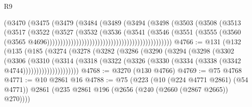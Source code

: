 \begin{lexlean}{R9}
\begin{coremodule}
                                                        (@3470
                                                          (@3475
                                                            (@3479
                                                              (@3484
                                                                (@3489
                                                                  (@3494
                                                                    (@3498
                                                                      (@3503
                                                                        (@3508
                                                                          (@3513
                                                                            (@3517
                                                                              (@3522
                                                                                (@3527
                                                                                  (@3532
                                                                                    (@3536
                                                                                      (@3541
                                                                                        (@3546
                                                                                          (@3551
                                                                                            (@3555
                                                                                              (@3560
                                                                                                (@3565
                                                                                                  @4696)))))))))))))))))))))))))))))))))))))))))))))))
@4766 := @131
    (@132
      (@135
        (@185
          (@3274
            (@3278
              (@3282
                (@3286
                  (@3290
                    (@3294
                      (@3298
                        (@3302
                          (@3306
                            (@3310
                              (@3314
                                (@3318
                                  (@3322
                                    (@3326 (@3330 (@3334 (@3338 (@3342 @4744)))))))))))))))))))))
@4768 := @3270 (@130 @4766)
@4769 := @75 @4768
@4771 := @10 @2861 @16
@4788 := @75
    (@223
      (@10 (@224 @4771 @2861) (@54 @4771))
      @2861
      (@235 @2861 @196 (@2656 (@240 (@2660 (@2867 @2665)) @270))))

\end{coremodule}
\end{lexlean}
